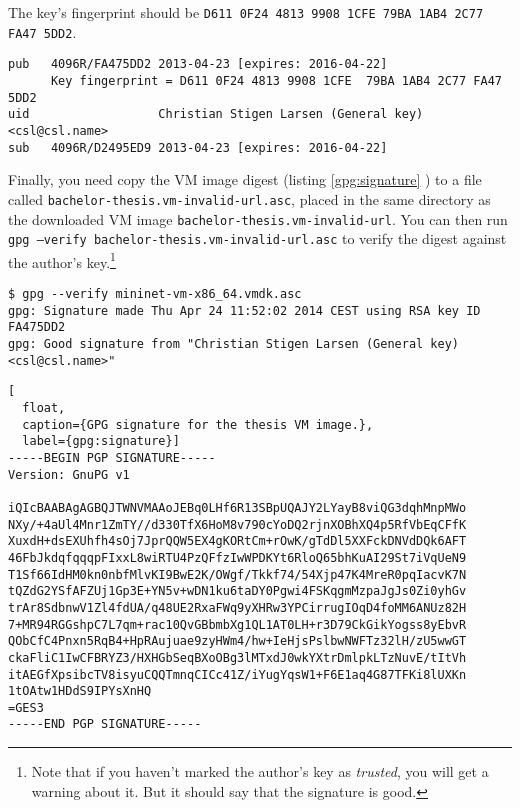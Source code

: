The key's fingerprint should be \texttt{D611 0F24 4813 9908 1CFE  79BA 1AB4
  2C77 FA47 5DD2}.

\begin{lstlisting}[label={gpg:key.fingerprint}]
pub   4096R/FA475DD2 2013-04-23 [expires: 2016-04-22]
      Key fingerprint = D611 0F24 4813 9908 1CFE  79BA 1AB4 2C77 FA47 5DD2
uid                  Christian Stigen Larsen (General key) <csl@csl.name>
sub   4096R/D2495ED9 2013-04-23 [expires: 2016-04-22]
\end{lstlisting}

Finally, you need copy the VM image digest (listing \ref{gpg:signature}
) to a file called
\texttt{bachelor-thesis.vm-invalid-url.asc}, placed in the same directory as
the downloaded VM image \texttt{bachelor-thesis.vm-invalid-url}.  You can then run
\texttt{gpg --verify bachelor-thesis.vm-invalid-url.asc} to verify the
digest against the author's key.\footnote{Note that if you haven't marked the
author's key as \textit{trusted}, you will get a warning about it.
But it should say that the signature is good.}

\begin{Verbatim}
$ gpg --verify mininet-vm-x86_64.vmdk.asc
gpg: Signature made Thu Apr 24 11:52:02 2014 CEST using RSA key ID FA475DD2
gpg: Good signature from "Christian Stigen Larsen (General key) <csl@csl.name>"
\end{Verbatim}

\begin{lstlisting}[
  float,
  caption={GPG signature for the thesis VM image.},
  label={gpg:signature}]
-----BEGIN PGP SIGNATURE-----
Version: GnuPG v1

iQIcBAABAgAGBQJTWNVMAAoJEBq0LHf6R13SBpUQAJY2LYayB8viQG3dqhMnpMWo
NXy/+4aUl4Mnr1ZmTY//d330TfX6HoM8v790cYoDQ2rjnXOBhXQ4p5RfVbEqCFfK
XuxdH+dsEXUhfh4sOj7JprQQW5EX4gKORtCm+rOwK/gTdDl5XXFckDNVdDQk6AFT
46FbJkdqfqqqpFIxxL8wiRTU4PzQFfzIwWPDKYt6RloQ65bhKuAI29St7iVqUeN9
T1Sf66IdHM0kn0nbfMlvKI9BwE2K/OWgf/Tkkf74/54Xjp47K4MreR0pqIacvK7N
tQZdG2YSfAFZUj1Gp3E+YN5v+wDN1ku6taDY0Pgwi4FSKqgmMzpaJgJs0Zi0yhGv
trAr8SdbnwV1Zl4fdUA/q48UE2RxaFWq9yXHRw3YPCirrugIOqD4foMM6ANUz82H
7+MR94RGGshpC7L7qm+rac10QvGBbmbXg1QL1AT0LH+r3D79CkGikYogss8yEbvR
QObCfC4Pnxn5RqB4+HpRAujuae9zyHWm4/hw+IeHjsPslbwNWFTz32lH/zU5wwGT
ckaFliC1IwCFBRYZ3/HXHGbSeqBXoOBg3lMTxdJ0wkYXtrDmlpkLTzNuvE/tItVh
itAEGfXpsibcTV8isyuCQQTmnqCICc41Z/iYugYqsW1+F6E1aq4G87TFKi8lUXKn
1tOAtw1HDdS9IPYsXnHQ
=GES3
-----END PGP SIGNATURE-----
\end{lstlisting}

